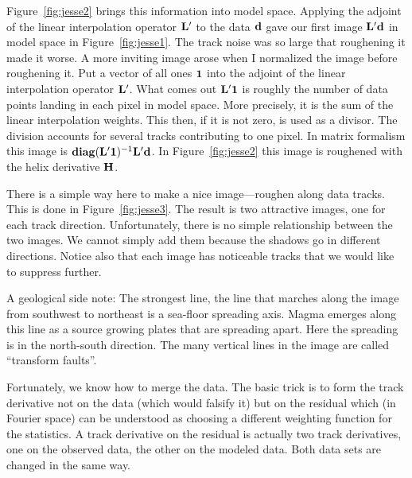 \par
Figure~\ref{fig:jesse2} brings this information into model space.
Applying the adjoint of the linear interpolation operator $\bold L'$
to the data $\bold d$ gave our first image $\bold L'\bold d$
in model space in Figure~\ref{fig:jesse1}.
The track noise was so large that roughening it made it worse.
A more inviting image arose when I normalized the image before roughening it.
Put a vector of all ones $\bold 1$ into the
adjoint of the linear interpolation operator $\bold L'$.
What comes out $\bold L'\bold 1$
is roughly the number of data points landing in each pixel in model space.
More precisely, it is the sum of the linear interpolation weights.
This then, if it is not zero, is used as a divisor.
The division accounts for several tracks contributing to one pixel.
In matrix formalism this image is
${\bf diag}(\bold L'\bold 1)^{-1} \bold L'\bold d$.
In Figure~\ref{fig:jesse2} this image is roughened
with the helix derivative $\bold H$.


\par
There is a simple way here to make a nice image---roughen
along data tracks.
This is done in
Figure~\ref{fig:jesse3}.
The result is two attractive images, one for each track direction.
Unfortunately, there is no simple relationship between the two images.
We cannot simply add them because the shadows go in different directions.
Notice also that each image has noticeable tracks that we would
like to suppress further.
\par
A geological side note:
The strongest line, the line that marches along the image from
southwest to northeast is a sea-floor spreading axis.
Magma emerges along this line
as a source growing plates that are spreading apart.
Here the spreading is in the north-south direction.
The many vertical lines in the image are called ``transform faults''.

\par
Fortunately, we know how to merge the data.
The basic trick is to form the track derivative
not on the data (which would falsify it)
but on the residual which
(in Fourier space) can be understood as
choosing a different weighting function for the statistics.
A track derivative on the residual is actually two track derivatives,
one on the observed data, the other on the modeled data.
Both data sets are changed in the same way.

